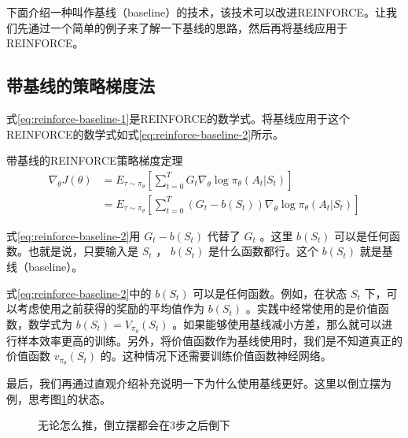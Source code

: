 \documentclass[lang=cn,newtx,10pt,scheme=chinese]{elegantbook}
\begin{document}
下面介绍一种叫作基线（baseline）的技术，该技术可以改进REINFORCE。让我们先通过一个简单的例子来了解一下基线的思路，然后再将基线应用于REINFORCE。

\subsection{带基线的策略梯度法}

式\ref{eq:reinforce-baseline-1}是REINFORCE的数学式。将基线应用于这个REINFORCE的数学式如式\ref{eq:reinforce-baseline-2}所示。

\begin{theorem}{带基线的REINFORCE策略梯度定理}{}
\begin{align}
\nabla_{\theta}J(\theta) &= E_{\tau\sim\pi_{\theta}}[\sum_{t=0}^T G_t\nabla_{\theta}\log\pi_{\theta}(A_t|S_t)] \label{eq:reinforce-baseline-1} \\
&= E_{\tau\sim\pi_{\theta}}[\sum_{t=0}^T (G_t-b(S_t))\nabla_{\theta}\log\pi_{\theta}(A_t|S_t)] \label{eq:reinforce-baseline-2}
\end{align}
\end{theorem}

式\ref{eq:reinforce-baseline-2}用 $G_t-b(S_t)$ 代替了 $G_t$ 。这里 $b(S_t)$ 可以是任何函数。也就是说，只要输入是 $S_t$ ， $b(S_t)$ 是什么函数都行。这个 $b(S_t)$ 就是基线（baseline）。

式\ref{eq:reinforce-baseline-2}中的 $b(S_t)$ 可以是任何函数。例如，在状态 $S_t$ 下，可以考虑使用之前获得的奖励的平均值作为 $b(S_t)$ 。实践中经常使用的是价值函数，数学式为 $b(S_t)=V_{\pi_{\theta}}(S_t)$ 。如果能够使用基线减小方差，那么就可以进行样本效率更高的训练。另外，将价值函数作为基线使用时，我们是不知道真正的价值函数 $v_{\pi_{\theta}}(S_t)$ 的。这种情况下还需要训练价值函数神经网络。

最后，我们再通过直观介绍补充说明一下为什么使用基线更好。这里以倒立摆为例，思考图\ref{fig:cartpole-failed}的状态。

\begin{figure}[!ht]
\centering
{}%
\caption{无论怎么推，倒立摆都会在3步之后倒下}
\label{fig:cartpole-failed}
\end{figure}
\end{document}
